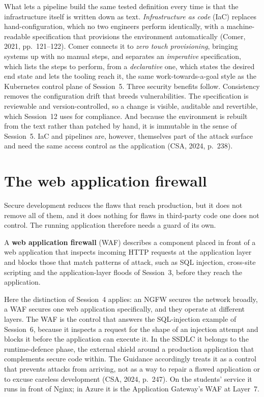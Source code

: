 What lets a pipeline build the same tested definition every time is that
the infrastructure itself is written down as text. \emph{Infrastructure as
code} (IaC) replaces hand-configuration, which no two engineers perform
identically, with a machine-readable specification that provisions the
environment automatically (Comer, 2021, pp.~121--122). Comer connects it to
\emph{zero touch provisioning}, bringing systems up with no manual steps,
and separates an \emph{imperative} specification, which lists the steps to
perform, from a \emph{declarative} one, which states the desired end state
and lets the tooling reach it, the same work-towards-a-goal style as the
Kubernetes control plane of Session~5. Three security benefits follow.
Consistency removes the configuration drift that breeds vulnerabilities. The
specification is reviewable and version-controlled, so a change is visible,
auditable and revertible, which Session~12 uses for compliance. And because
the environment is rebuilt from the text rather than patched by hand, it is
immutable in the sense of Session~5. IaC and pipelines are, however,
themselves part of the attack surface and need the same access control as
the application (CSA, 2024, p.~238).

\section{The web application firewall}

Secure development reduces the flaws that reach production, but it does not
remove all of them, and it does nothing for flaws in third-party code one
does not control. The running application therefore needs a guard of its
own.

\begin{definition}\label{def:waf}
A \textbf{web application firewall} (WAF) describes a component placed in
front of a web application that inspects incoming HTTP requests at the
application layer and blocks those that match patterns of attack, such as SQL
injection, cross-site scripting and the application-layer floods of
Session~3, before they reach the application.
\end{definition}

Here the distinction of Session~4 applies: an NGFW secures the network
broadly, a WAF secures one web application specifically, and they operate at
different layers. The WAF is the control that answers the SQL-injection
example of Session~6, because it inspects a request for the shape of an
injection attempt and blocks it before the application can execute it. In
the SSDLC it belongs to the runtime-defence phase, the external shield
around a production application that complements secure code within. The
Guidance accordingly treats it as a control that prevents attacks from
arriving, not as a way to repair a flawed application or to excuse careless
development (CSA, 2024, p.~247). On the students' service it runs in front
of Nginx; in Azure it is the Application Gateway's WAF at Layer~7.

